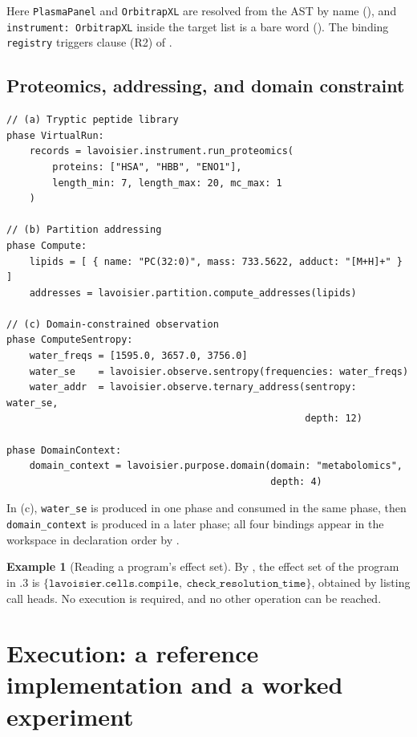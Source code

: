 \documentclass[11pt,twocolumn,a4paper]{article}
\theoremstyle{ssthm}
\theoremstyle{definition}
\newtheorem{example}[theorem]{Example}
\theoremstyle{remark}
\newcommand{\shk}[1]{\texttt{#1}}
\begin{document}
Here \shk{PlasmaPanel} and \shk{OrbitrapXL} are resolved from the AST by
name (), and \shk{instrument: OrbitrapXL} inside the
target list is a bare word (). The binding
\shk{registry} triggers clause (R2) of .

\subsection{Proteomics, addressing, and domain constraint}

\begin{lstlisting}[caption={Three further programs, abbreviated.}]
// (a) Tryptic peptide library
phase VirtualRun:
    records = lavoisier.instrument.run_proteomics(
        proteins: ["HSA", "HBB", "ENO1"],
        length_min: 7, length_max: 20, mc_max: 1
    )

// (b) Partition addressing
phase Compute:
    lipids = [ { name: "PC(32:0)", mass: 733.5622, adduct: "[M+H]+" } ]
    addresses = lavoisier.partition.compute_addresses(lipids)

// (c) Domain-constrained observation
phase ComputeSentropy:
    water_freqs = [1595.0, 3657.0, 3756.0]
    water_se    = lavoisier.observe.sentropy(frequencies: water_freqs)
    water_addr  = lavoisier.observe.ternary_address(sentropy: water_se,
                                                    depth: 12)

phase DomainContext:
    domain_context = lavoisier.purpose.domain(domain: "metabolomics",
                                              depth: 4)
\end{lstlisting}

In (c), \shk{water\_se} is produced in one phase and consumed in the
same phase, then \shk{domain\_context} is produced in a later phase; all
four bindings appear in the workspace in declaration order by
.

\begin{example}[Reading a program's effect set]
\label{ex:effects}
By , the effect set of the program in
.3 is
$\{\shk{lavoisier.cells.compile},\ \shk{check\_resolution\_time}\}$,
obtained by listing call heads. No execution is required, and no other
operation can be reached.
\end{example}

\section{Execution: a reference implementation and a worked experiment}
\label{sec:execution}
\end{document}
